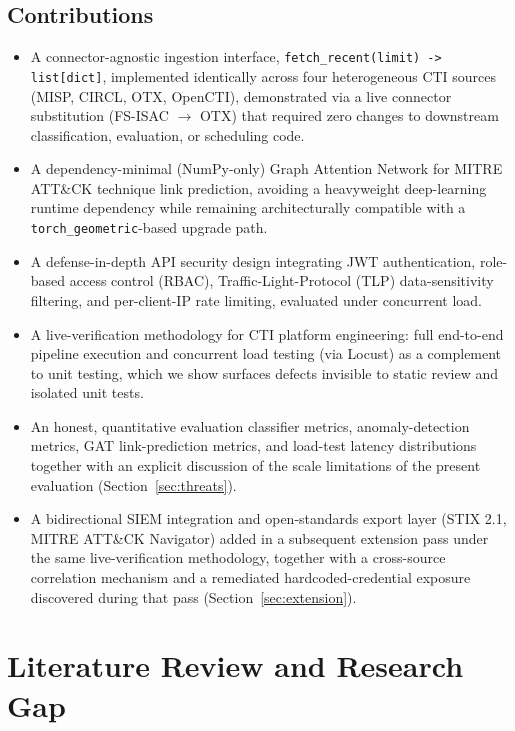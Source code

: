 \documentclass[conference]{IEEEtran}
\begin{document}
\subsection{Contributions}
\begin{itemize}
\item A connector-agnostic ingestion interface, \texttt{fetch\_recent(limit) -> list[dict]}, implemented identically across four heterogeneous CTI sources (MISP, CIRCL, OTX, OpenCTI), demonstrated via a live connector substitution (FS-ISAC $\rightarrow$ OTX) that required zero changes to downstream classification, evaluation, or scheduling code.
\item A dependency-minimal (NumPy-only) Graph Attention Network for MITRE ATT\&CK technique link prediction, avoiding a heavyweight deep-learning runtime dependency while remaining architecturally compatible with a \texttt{torch\_geometric}-based upgrade path.
\item A defense-in-depth API security design integrating JWT authentication, role-based access control (RBAC), Traffic-Light-Protocol (TLP) \cite{first_tlp} data-sensitivity filtering, and per-client-IP rate limiting, evaluated under concurrent load.
\item A live-verification methodology for CTI platform engineering: full end-to-end pipeline execution and concurrent load testing (via Locust) as a complement to unit testing, which we show surfaces defects invisible to static review and isolated unit tests.
\item An honest, quantitative evaluation \textemdash{} classifier metrics, anomaly-detection metrics, GAT link-prediction metrics, and load-test latency distributions \textemdash{} together with an explicit discussion of the scale limitations of the present evaluation (Section~\ref{sec:threats}).
\item A bidirectional SIEM integration and open-standards export layer (STIX 2.1, MITRE ATT\&CK Navigator) added in a subsequent extension pass under the same live-verification methodology, together with a cross-source correlation mechanism and a remediated hardcoded-credential exposure discovered during that pass (Section~\ref{sec:extension}).
\end{itemize}

\section{Literature Review and Research Gap}
\label{sec:litreview}
\end{document}
